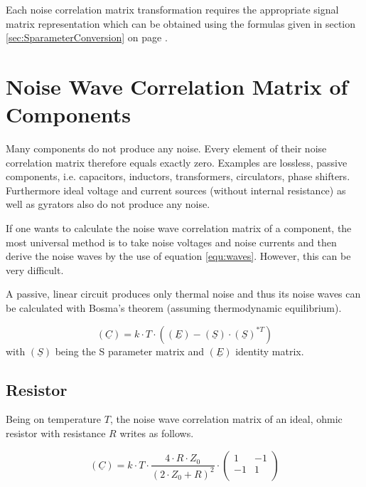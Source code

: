 \documentclass[10pt]{report}
\begin{document}
\addvspace{12pt}

Each noise correlation matrix transformation requires the appropriate
signal matrix representation which can be obtained using the formulas
given in section \ref{sec:SparameterConversion} on page
\pageref{sec:SparameterConversion}.

\section{Noise Wave Correlation Matrix of Components}

Many components do not produce any noise.  Every element of their
noise correlation matrix therefore equals exactly zero.  Examples are
lossless, passive components, i.e. capacitors, inductors,
transformers, circulators, phase shifters.  Furthermore ideal voltage
and current sources (without internal resistance) as well as gyrators
also do not produce any noise.

\addvspace{12pt}

If one wants to calculate the noise wave correlation matrix of a
component, the most universal method is to take noise voltages and
noise currents and then derive the noise waves by the use of equation
\eqref{equ:waves}.  However, this can be very difficult.

\addvspace{12pt}

A passive, linear circuit produces only thermal noise and thus its
noise waves can be calculated with Bosma's theorem (assuming
thermodynamic equilibrium).

\begin{equation}
(\underline{C}) = k\cdot T\cdot \left( (\underline{E}) - (\underline{S})\cdot(\underline{S})^{*T} \right)
\end{equation}
with $(\underline{S})$ being the S parameter matrix and $(\underline{E})$ identity matrix.


\subsection{Resistor}

Being on temperature $T$, the noise wave correlation matrix of an
ideal, ohmic resistor with resistance $R$ writes as follows.

\begin{equation}
(\underline{C}) = k\cdot T\cdot\frac{4\cdot R\cdot Z_0}{(2\cdot Z_0+R)^2}\cdot
\begin{pmatrix}
   1 & -1\\
  -1 &  1\\
\end{pmatrix}
\end{equation}
\end{document}
